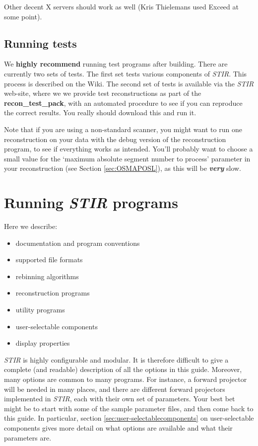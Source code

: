 \documentclass{article}
\begin{document}
Other decent X servers should work as well (Kris Thielemans used Exceed at 
some point).


\subsection{
Running tests}

We \textbf{highly recommend} running test programs after building. There are currently two
sets of tests. The first set tests various components of \textit{STIR}. This process is described on the Wiki.
The second set of tests is available via the \textit{STIR} web-site, where we 
we provide test reconstructions as part of the
\textbf{recon\_test\_pack}, with an 
automated procedure to see if you can reproduce the correct results. 
You really should download this and run it.


Note that if you are using a non-standard scanner, 
you might want to run one reconstruction on your data with 
the debug version of the reconstruction program, to see if everything 
works as intended. You'll probably want to choose a small value 
for the `maximum absolute segment number to process' parameter 
in your reconstruction (see Section \ref{sec:OSMAPOSL}), as this will be \textbf{\textit{very}} 
slow.




\section{
Running \textit{STIR} programs}

Here we describe:
\begin{itemize}
\item documentation and program conventions
\item supported file formats 
\item rebinning algorithms
\item reconstruction programs
\item utility programs
\item user-selectable components
\item display properties
\end{itemize}

\textit{STIR} is highly configurable and modular. It is therefore difficult to give a complete (and readable)
description of all the options in this guide. Moreover, many options are common to many
programs. For instance, a forward projector will be needed in many places, and there are 
different forward projectors implemented in \textit{STIR}, each with their own set of 
parameters. Your best bet might be to start with some of the sample parameter files, and then
come back to this guide. In particular, section \ref{sec:user-selectablecomponents}
on user-selectable components gives more detail on what options are available
and what their parameters are.
\end{document}
